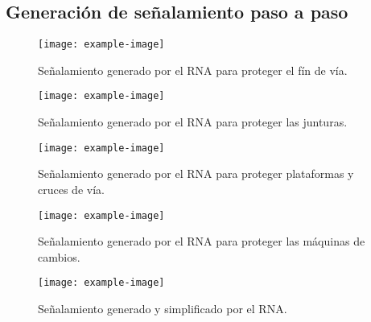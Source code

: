 \subsection{Generación de señalamiento paso a paso}

\lipsum[1]

\begin{figure}[H]
	\centering
	\texttt{[image: example-image]}
	\centering\caption{Señalamiento generado por el RNA para proteger el fín de vía.}
\end{figure}

\lipsum[1]

\begin{figure}[H]
	\centering
	\texttt{[image: example-image]}
	\centering\caption{Señalamiento generado por el RNA para proteger las junturas.}
\end{figure}

\lipsum[1]

\begin{figure}[H]
	\centering
	\texttt{[image: example-image]}
	\centering\caption{Señalamiento generado por el RNA para proteger plataformas y cruces de vía.}
\end{figure}

\lipsum[1]

 \begin{figure}[H]
	\centering
	\texttt{[image: example-image]}
	\centering\caption{Señalamiento generado por el RNA para proteger las máquinas de cambios.}
\end{figure}

\lipsum[1]

 \begin{figure}[H]
	\centering
	\texttt{[image: example-image]}
	\centering\caption{Señalamiento generado y simplificado por el RNA.}
\end{figure}

\lipsum[1]